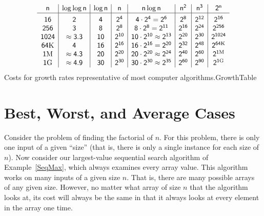 \begin{mytable}
{\sffamily
\[
\begin{array}
{c|c|c|c|c|c|c|c}
\mathsf{n} & \mathsf{\log \log n} & \mathsf{\log n} & \mathsf{n} &
\mathsf{n \log n} & \mathsf{n^2} & \mathsf{n^3} & \mathsf{2^n}\\
\hline
\mathsf{16} & \mathsf{2} & \mathsf{4} & \mathsf{2^{4}} &
\mathsf{4 \cdot 2^{4} = 2^{6}}\rule{0pt}{12pt} &
\mathsf{2^{8}} & \mathsf{2^{12}} & \mathsf{2^{16}}\\
\mathsf{256} & \mathsf{3} & \mathsf{8} & \mathsf{2^{8}} &
\mathsf{8 \cdot 2^{8} = 2^{11}} &
\mathsf{2^{16}} & \mathsf{2^{24}} & \mathsf{2^{256}}\\
\mathsf{1024} & \mathsf{\approx 3.3} & \mathsf{10} & \mathsf{2^{10}} &
\mathsf{10 \cdot 2^{10} \approx 2^{13}} &
\mathsf{2^{20}} & \mathsf{2^{30}} & \mathsf{2^{1024}}\\
\mathsf{64 {\rm K}} & \mathsf{4} & \mathsf{16} & \mathsf{2^{16}} &
\mathsf{16 \cdot 2^{16} = 2^{20}} &
\mathsf{2^{32}} & \mathsf{2^{48}} & \mathsf{2^{64 {\rm K}}}\\
\mathsf{1 {\rm M}} & \mathsf{\approx 4.3} & \mathsf{20} & \mathsf{2^{20}} &
\mathsf{20 \cdot 2^{20} \approx 2^{24}} &
\mathsf{2^{40}} & \mathsf{2^{60}} & \mathsf{2^{1 {\rm M}}}\\
\mathsf{1 {\rm G}} & \mathsf{\approx 4.9} & \mathsf{30} & \mathsf{2^{30}} &
\mathsf{30 \cdot 2^{30} \approx 2^{35}} &
\mathsf{2^{60}} & \mathsf{2^{90}} & \mathsf{2^{1 {\rm G}}}\\
\end{array}
\]
}
\vspace{-\bigskipamount}
\vspace{-\bigskipamount}
{Costs for growth rates representative of most computer
algorithms.}{GrowthTable}
\end{mytable}


\newpage

\section{Best, Worst, and Average Cases}


Consider the problem of finding the factorial of \(n\).
For this problem, there is only one input of a given ``size'' (that
is, there is only a single instance for each size of \(n\)).
Now consider our largest-value sequential search
algorithm of Example~\ref{SeqMax}, which always examines every array
value.
This algorithm works on many inputs of a given size \(n\).
That is, there are many possible arrays of any given size.
However, no matter what array of size \(n\) that the algorithm looks
at, its cost will always be the same in that it always looks at every
element in the array one time.

